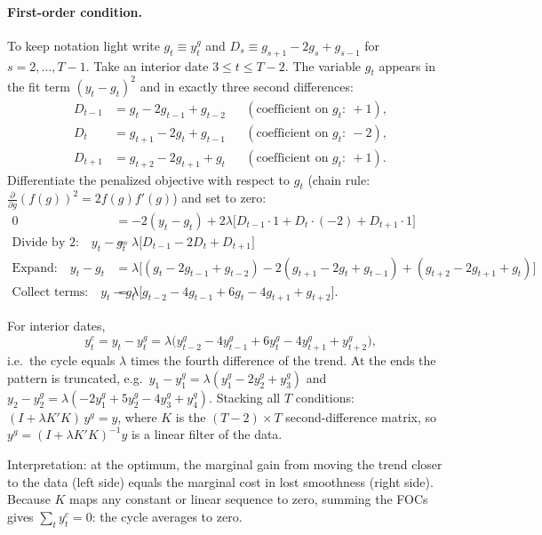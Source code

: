 \paragraph{First-order condition.} To keep notation light write $g_t\equiv y_t^g$ and $D_s\equiv g_{s+1}-2g_s+g_{s-1}$ for $s=2,\dots,T-1$. Take an interior date $3\le t\le T-2$. The variable $g_t$ appears in the fit term $(y_t-g_t)^2$ and in exactly three second differences:
\begin{align*}
D_{t-1}&=g_t-2g_{t-1}+g_{t-2} &&(\text{coefficient on }g_t:\ +1),\\
D_t&=g_{t+1}-2g_t+g_{t-1} &&(\text{coefficient on }g_t:\ -2),\\
D_{t+1}&=g_{t+2}-2g_{t+1}+g_t &&(\text{coefficient on }g_t:\ +1).
\end{align*}
Differentiate the penalized objective with respect to $g_t$ (chain rule: $\frac{\partial}{\partial g}(f(g))^2=2f(g)f'(g)$) and set to zero:
\begin{align*}
0&=-2(y_t-g_t)+2\lambda\big[D_{t-1}\cdot 1+D_t\cdot(-2)+D_{t+1}\cdot 1\big]\\
\text{Divide by 2:}\quad y_t-g_t&=\lambda\big[D_{t-1}-2D_t+D_{t+1}\big]\\
\text{Expand:}\quad y_t-g_t&=\lambda\big[(g_t-2g_{t-1}+g_{t-2})-2(g_{t+1}-2g_t+g_{t-1})+(g_{t+2}-2g_{t+1}+g_t)\big]\\
\text{Collect terms:}\quad y_t-g_t&=\lambda\big[g_{t-2}-4g_{t-1}+6g_t-4g_{t+1}+g_{t+2}\big].
\end{align*}
\begin{keybox}[title=HP filter first-order condition]
For interior dates,
\[
y_t^c=y_t-y_t^g=\lambda\big(y_{t-2}^g-4y_{t-1}^g+6y_t^g-4y_{t+1}^g+y_{t+2}^g\big),
\]
i.e.\ the cycle equals $\lambda$ times the fourth difference of the trend. At the ends the pattern is truncated, e.g.\ $y_1-y_1^g=\lambda(y_1^g-2y_2^g+y_3^g)$ and $y_2-y_2^g=\lambda(-2y_1^g+5y_2^g-4y_3^g+y_4^g)$. Stacking all $T$ conditions: $(I+\lambda K'K)\,y^g=y$, where $K$ is the $(T-2)\times T$ second-difference matrix, so $y^g=(I+\lambda K'K)^{-1}y$ is a linear filter of the data.
\end{keybox}
Interpretation: at the optimum, the marginal gain from moving the trend closer to the data (left side) equals the marginal cost in lost smoothness (right side). Because $K$ maps any constant or linear sequence to zero, summing the FOCs gives $\sum_t y_t^c=0$: the cycle averages to zero.

